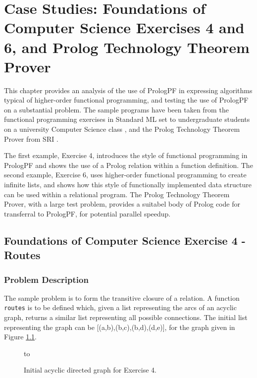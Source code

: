 \chapter[Case Studies]{Case Studies:
  Foundations of Computer Science Exercises 4 and 6, and
  Prolog Technology Theorem Prover}
\label{case}

This chapter provides an analysis of the use of PrologPF in
expressing algorithms typical of higher-order functional programming, and
testing the use of PrologPF on a substantial problem.
The sample programs have been taken from the functional programming
exercises in Standard ML \cite{MTH90} 
set to undergraduate students on a university Computer
Science class \cite{Pau88}, and the
Prolog Technology Theorem Prover from SRI \cite{Sti88}.

The first example, Exercise 4, introduces the style of
functional programming in PrologPF
and shows the use of a Prolog relation within
a function definition.  The second example, Exercise 6, uses higher-order
functional programming to create infinite lists, and shows how this
style of functionally implemented data structure can be used within
a relational program.  The Prolog Technology Theorem Prover, with a
large test problem, provides a suitabel body of Prolog code for transferral
to PrologPF, for potential parallel speedup.

\section{Foundations of Computer Science Exercise 4 - Routes} %

\subsection{Problem Description}

The sample problem is to form the transitive closure of a relation.  A function
\texttt{routes} is to be defined which, given a list representing the arcs of an
acyclic graph, returns a similar list representing all possible connections.
The initial list representing the graph can be [(a,b),(b,c),(b,d),(d,e)], for
the graph given in Figure \ref{ex4_1}.

\begin{figure}[htbp]
\vspace{5mm} \hbox to 
\caption{Initial acyclic directed graph for Exercise 4.}
\vspace{5mm}
\label{ex4_1}
\end{figure}

